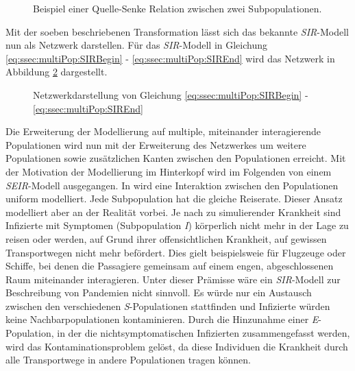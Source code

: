 \begin{figure}
\begin{center}\end{center}
\caption{Beispiel einer Quelle-Senke Relation zwischen zwei Subpopulationen.}\label{fig:ssec:multiPop:simpleDirectedEdge}
\end{figure}

Mit der soeben beschriebenen Transformation lässt sich das bekannte \emph{SIR}-Modell nun als Netzwerk darstellen. Für das \emph{SIR}-Modell in Gleichung \ref{eq:ssec:multiPop:SIRBegin} - \ref{eq:ssec:multiPop:SIREnd} wird das Netzwerk in Abbildung \ref{fig:ssec:multiPop:SIRNet} dargestellt.

\begin{figure}
\begin{center}
\end{center}
\caption{Netzwerkdarstellung von Gleichung \ref{eq:ssec:multiPop:SIRBegin} - \ref{eq:ssec:multiPop:SIREnd}}\label{fig:ssec:multiPop:SIRNet}
\end{figure}

Die Erweiterung der Modellierung auf multiple, miteinander interagierende Populationen wird nun mit der Erweiterung des Netzwerkes um weitere Populationen sowie zusätzlichen Kanten zwischen den Populationen erreicht. Mit der Motivation der Modellierung im Hinterkopf wird im Folgenden von einem \emph{SEIR}-Modell ausgegangen. In \cite{Sattenspiel1995} wird eine Interaktion zwischen den Populationen uniform modelliert. Jede Subpopulation hat die gleiche Reiserate. Dieser Ansatz modelliert aber an der Realität vorbei. Je nach zu simulierender Krankheit sind Infizierte mit Symptomen (Subpopulation \emph{I}) körperlich nicht mehr in der Lage zu reisen oder werden, auf Grund ihrer offensichtlichen Krankheit, auf gewissen Transportwegen nicht mehr befördert. Dies gielt beispielsweie für Flugzeuge oder Schiffe, bei denen die Passagiere gemeinsam auf einem engen, abgeschlossenen Raum miteinander interagieren. Unter dieser Prämisse wäre ein \emph{SIR}-Modell zur Beschreibung von Pandemien nicht sinnvoll. Es würde nur ein Austausch zwischen den verschiedenen \emph{S}-Populationen stattfinden und Infizierte würden keine Nachbarpopulationen kontaminieren.  Durch die Hinzunahme einer \emph{E}-Population, in der die nichtsymptomatischen Infizierten zusammengefasst werden, wird das Kontaminationsproblem gelöst, da diese Individuen die Krankheit durch alle Transportwege in andere Populationen tragen können. 


